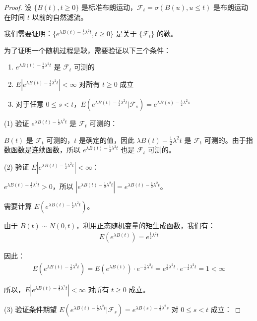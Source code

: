 \documentclass[lang=cn,10pt,thmcnt=section]{elegantbook}
\begin{document}
\begin{proof}
		设 $\{B(t), t \geq 0\}$ 是标准布朗运动，$\mathcal{F}_t = \sigma(B(u), u \leq t)$ 是布朗运动在时间 $t$ 以前的自然滤流。
		
		我们需要证明：$\{e^{\lambda B(t) - \frac{1}{2} \lambda^2 t}, t \geq 0\}$ 是关于 $\{\mathcal{F}_t\}$ 的鞅。
		
		为了证明一个随机过程是鞅，需要验证以下三个条件：
		\begin{enumerate}
			\item $e^{\lambda B(t) - \frac{1}{2} \lambda^2 t}$ 是 $\mathcal{F}_t$ 可测的
			\item $E|e^{\lambda B(t) - \frac{1}{2} \lambda^2 t}| < \infty$ 对所有 $t \geq 0$ 成立
			\item 对于任意 $0 \leq s < t$，$E(e^{\lambda B(t) - \frac{1}{2} \lambda^2 t} | \mathcal{F}_s) = e^{\lambda B(s) - \frac{1}{2} \lambda^2 s}$
		\end{enumerate}
		
		(1) 验证 $e^{\lambda B(t) - \frac{1}{2} \lambda^2 t}$ 是 $\mathcal{F}_t$ 可测的：
		
		$B(t)$ 是 $\mathcal{F}_t$ 可测的，$t$ 是确定的值，因此 $\lambda B(t) - \frac{1}{2} \lambda^2 t$ 是 $\mathcal{F}_t$ 可测的。由于指数函数是连续函数，所以 $e^{\lambda B(t) - \frac{1}{2} \lambda^2 t}$ 也是 $\mathcal{F}_t$ 可测的。
		
		(2) 验证 $E|e^{\lambda B(t) - \frac{1}{2} \lambda^2 t}| < \infty$：
		
		$e^{\lambda B(t) - \frac{1}{2} \lambda^2 t} > 0$，所以 $|e^{\lambda B(t) - \frac{1}{2} \lambda^2 t}| = e^{\lambda B(t) - \frac{1}{2} \lambda^2 t}$。
		
		需要计算 $E(e^{\lambda B(t) - \frac{1}{2} \lambda^2 t})$。
		
		由于 $B(t) \sim N(0, t)$，利用正态随机变量的矩生成函数，我们有：
		\begin{align}
		E(e^{\lambda B(t)}) = e^{\frac{1}{2} \lambda^2 t}
		\end{align}
		
		因此：
		\begin{align}
		E(e^{\lambda B(t) - \frac{1}{2} \lambda^2 t}) = E(e^{\lambda B(t)}) \cdot e^{-\frac{1}{2} \lambda^2 t} = e^{\frac{1}{2} \lambda^2 t} \cdot e^{-\frac{1}{2} \lambda^2 t} = 1 < \infty
		\end{align}
		
		所以，$E|e^{\lambda B(t) - \frac{1}{2} \lambda^2 t}| < \infty$ 对所有 $t \geq 0$ 成立。
		
		(3) 验证条件期望 $E(e^{\lambda B(t) - \frac{1}{2} \lambda^2 t} | \mathcal{F}_s) = e^{\lambda B(s) - \frac{1}{2} \lambda^2 s}$ 对 $0 \leq s < t$ 成立：
		

\end{proof}
\end{document}
